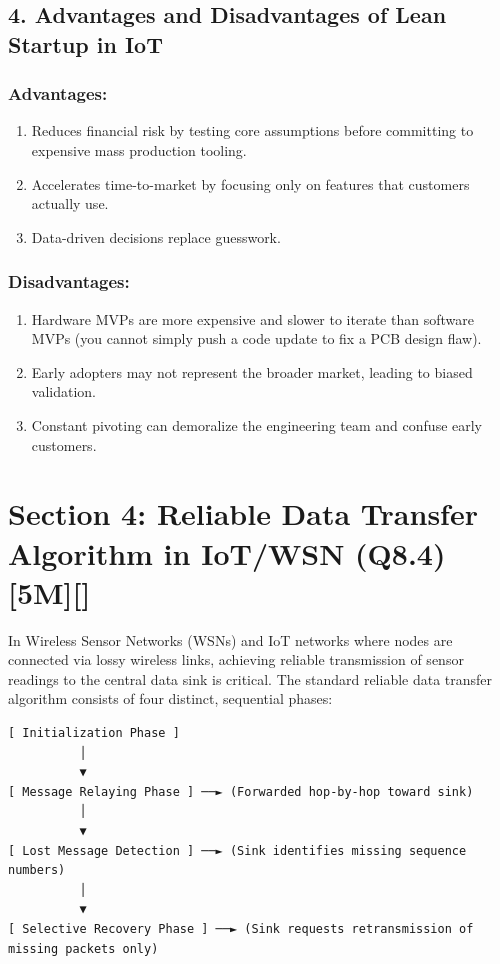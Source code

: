 \subsection{4. Advantages and Disadvantages of Lean Startup in IoT}

\subsubsection{Advantages:}
\begin{enumerate}
  \item Reduces financial risk by testing core assumptions before committing to expensive mass production tooling.
  \item Accelerates time-to-market by focusing only on features that customers actually use.
  \item Data-driven decisions replace guesswork.
\end{enumerate}

\subsubsection{Disadvantages:}
\begin{enumerate}
  \item Hardware MVPs are more expensive and slower to iterate than software MVPs (you cannot simply push a code update to fix a PCB design flaw).
  \item Early adopters may not represent the broader market, leading to biased validation.
  \item Constant pivoting can demoralize the engineering team and confuse early customers.
\end{enumerate}


\section{Section 4: Reliable Data Transfer Algorithm in IoT/WSN (Q8.4) [5M][]}

In Wireless Sensor Networks (WSNs) and IoT networks where nodes are connected via lossy wireless links, achieving reliable transmission of sensor readings to the central data sink is critical. The standard reliable data transfer algorithm consists of four distinct, sequential phases:

\begin{lstlisting}
[ Initialization Phase ]
          │
          ▼
[ Message Relaying Phase ] ──► (Forwarded hop-by-hop toward sink)
          │
          ▼
[ Lost Message Detection ] ──► (Sink identifies missing sequence numbers)
          │
          ▼
[ Selective Recovery Phase ] ──► (Sink requests retransmission of missing packets only)
\end{lstlisting}

